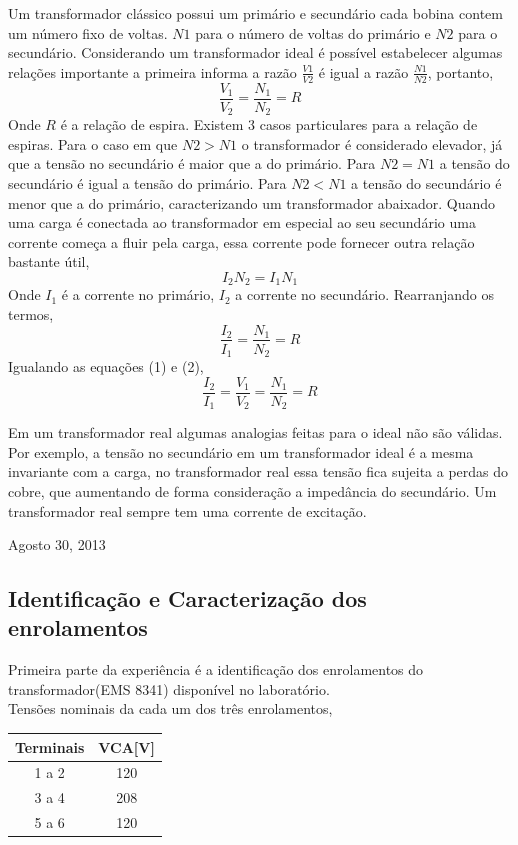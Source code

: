 \documentclass[conference]{IEEEtran}
\begin{document}
Um transformador clássico possui um primário e secundário cada bobina contem
um número fixo de voltas. $N1$ para o número de voltas do primário e $N2$ 
para o secundário. Considerando um transformador ideal é possível estabelecer 
algumas relações importante a primeira informa a razão $\frac{V1}{V2}$ é igual
a razão  $\frac{N1}{N2}$, portanto,
\begin{equation}
    \frac{V_1}{V_2} = \frac{N_1}{N_2} = R
\end{equation}
Onde $R$ é a relação de espira. Existem 3 casos particulares para a relação de espiras.
Para o caso em que $N2>N1$ o transformador é considerado elevador, já que a tensão
no secundário é maior que a do primário. Para $N2=N1$ a tensão do secundário é 
igual a tensão do primário. Para $N2<N1$ a tensão do secundário é menor que a do
primário, caracterizando um transformador abaixador. Quando uma carga é conectada
ao transformador em especial ao seu secundário uma corrente começa a fluir 
pela carga, essa corrente pode fornecer outra relação bastante útil, 
\begin{equation}
I_2 N_2 = I_1 N_1
\end{equation}
Onde $I_1$ é a corrente no primário, $I_2$ a corrente no secundário.
Rearranjando os termos,
\begin{equation}
    \frac{I_2}{I_1} = \frac{N_1}{N_2} = R
\end{equation}
Igualando as equações (1) e (2),
\begin{equation}
    \frac{I_2}{I_1} = \frac{V_1}{V_2} = \frac{N_1}{N_2} = R
\end{equation}

Em um transformador real algumas analogias feitas para o ideal não são válidas.
Por exemplo, a tensão no secundário em um transformador ideal é a mesma invariante
com a carga, no transformador real essa tensão fica sujeita a perdas do cobre, 
que aumentando de forma consideração a impedância do secundário. Um transformador
real sempre tem uma corrente de excitação.

 
\hfill Agosto 30, 2013

\subsection{Identificação e Caracterização dos enrolamentos}

Primeira parte da experiência é a identificação dos enrolamentos do
transformador(EMS 8341) disponível no laboratório.\\
Tensões nominais da cada um dos três enrolamentos,
\begin{center}
    \begin{tabular}{|c||c|}
        \hline 
        Terminais & VCA[V] \\
        \hline 
        1 a 2 & 120 \\
        3 a 4 & 208 \\
        5 a 6 & 120 \\
        \hline
    \end{tabular}
\end{center}
\end{document}
